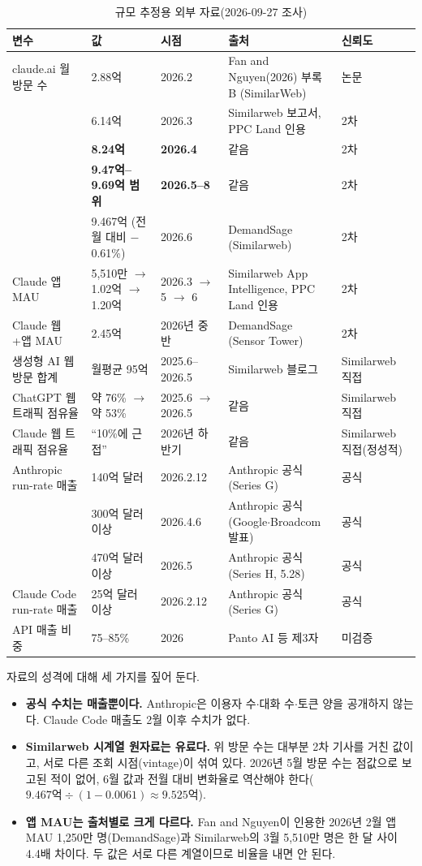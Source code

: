 \documentclass[11pt]{article}
\begin{document}
\begin{longtable}{L{3.0cm}L{2.9cm}L{1.9cm}L{4.4cm}L{2.4cm}}
\caption{규모 추정용 외부 자료(2026-09-27 조사)}\label{tab:sources}\\
\toprule
변수 & 값 & 시점 & 출처 & 신뢰도 \\
\midrule
\endhead
claude.ai 월 방문 수 & 2.88억 & 2026.2 & Fan and Nguyen(2026) 부록 B (SimilarWeb) & 논문 \\
 & 6.14억 & 2026.3 & Similarweb 보고서, PPC Land 인용 & 2차 \\
 & \textbf{8.24억} & \textbf{2026.4} & 같음 & 2차 \\
 & \textbf{9.47억--9.69억 범위} & \textbf{2026.5--8} & 같음 & 2차 \\
 & 9.467억 (전월 대비 $-$0.61\%) & 2026.6 & DemandSage (Similarweb) & 2차 \\
Claude 앱 MAU & 5,510만 $\to$ 1.02억 $\to$ 1.20억 & 2026.3 $\to$ 5 $\to$ 6 & Similarweb App Intelligence, PPC Land 인용 & 2차 \\
Claude 웹+앱 MAU & 2.45억 & 2026년 중반 & DemandSage (Sensor Tower) & 2차 \\
생성형 AI 웹 방문 합계 & 월평균 95억 & 2025.6--2026.5 & Similarweb 블로그 & Similarweb 직접 \\
ChatGPT 웹 트래픽 점유율 & 약 76\% $\to$ 약 53\% & 2025.6 $\to$ 2026.5 & 같음 & Similarweb 직접 \\
Claude 웹 트래픽 점유율 & ``10\%에 근접'' & 2026년 하반기 & 같음 & Similarweb 직접(정성적) \\
Anthropic run-rate 매출 & 140억 달러 & 2026.2.12 & Anthropic 공식(Series G) & 공식 \\
 & 300억 달러 이상 & 2026.4.6 & Anthropic 공식(Google$\cdot$Broadcom 발표) & 공식 \\
 & 470억 달러 이상 & 2026.5 & Anthropic 공식(Series H, 5.28) & 공식 \\
Claude Code run-rate 매출 & 25억 달러 이상 & 2026.2.12 & Anthropic 공식(Series G) & 공식 \\
API 매출 비중 & 75--85\% & 2026 & Panto AI 등 제3자 & 미검증 \\
\bottomrule
\end{longtable}

자료의 성격에 대해 세 가지를 짚어 둔다.
\begin{itemize}
  \item \textbf{공식 수치는 매출뿐이다.} Anthropic은 이용자 수$\cdot$대화 수$\cdot$토큰 양을 공개하지 않는다. Claude Code 매출도 2월 이후 수치가 없다.
  \item \textbf{Similarweb 시계열 원자료는 유료다.} 위 방문 수는 대부분 2차 기사를 거친 값이고, 서로 다른 조회 시점(vintage)이 섞여 있다. 2026년 5월 방문 수는 점값으로 보고된 적이 없어, 6월 값과 전월 대비 변화율로 역산해야 한다($9.467\text{억}\div(1-0.0061)\approx 9.525\text{억}$).
  \item \textbf{앱 MAU는 출처별로 크게 다르다.} Fan and Nguyen이 인용한 2026년 2월 앱 MAU 1,250만 명(DemandSage)과 Similarweb의 3월 5,510만 명은 한 달 사이 4.4배 차이다. 두 값은 서로 다른 계열이므로 비율을 내면 안 된다.
\end{itemize}
\end{document}
